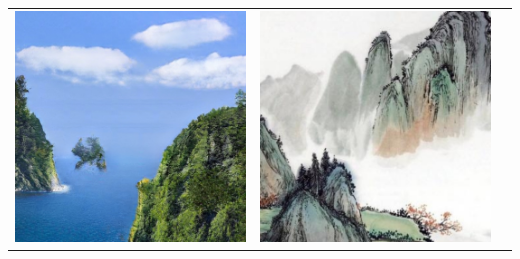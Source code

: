 \documentclass[a4paper, 12pt]{report}
\begin{document}
\begin{center}
  \centering
  \begin{tabular}{ccc}
    \includegraphics[height=0.15\textheight]{images/test-gaugan.jpg}&
    \includegraphics[height=0.15\textheight]{images/transfert-ds.jpg}&

\end{tabular}
\end{center}
\end{document}
